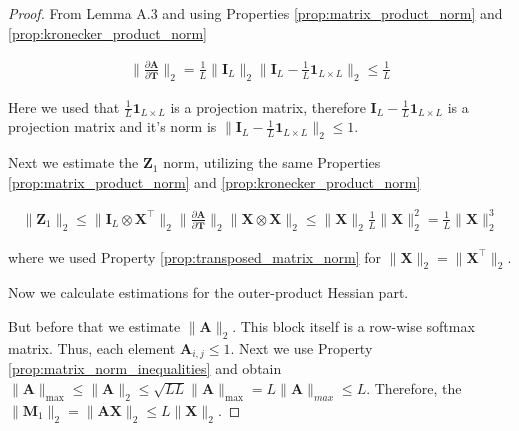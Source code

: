 \documentclass{article}
\begin{document}
\begin{proof}

From Lemma A.3 \cite{noci2022signalpropagationtransformerstheoretical} and using Properties \ref{prop:matrix_product_norm} and \ref{prop:kronecker_product_norm}

\begin{align*}
    \| \frac{\partial \mathbf{A}}{\partial \mathbf{T}}\|_2 = \frac{1}{L} \| \mathbf{I}_L\|_2 \| \mathbf{I}_L - \frac{1}{L}\mathbf{1}_{L \times L}\|_2 \leq \frac{1}{L}
\end{align*}

Here we used that $\frac{1}{L}\mathbf{1}_{L \times L}$ is a projection matrix, therefore $\mathbf{I}_L - \frac{1}{L}\mathbf{1}_{L \times L}$ is a projection matrix and it's norm is $\| \mathbf{I}_L - \frac{1}{L}\mathbf{1}_{L \times L}\|_2 \leq 1$.

Next we estimate the $\mathbf{Z}_1$  norm, utilizing the same Properties \ref{prop:matrix_product_norm} and \ref{prop:kronecker_product_norm}

\begin{align*}
    \| \mathbf{Z}_1\|_2 \leq \| \mathbf{I}_L \otimes \mathbf{X}^{\top}\|_2 \| \frac{\partial \mathbf{A}}{\partial \mathbf{T}}\|_2 \| \mathbf{X} \otimes \mathbf{X}\|_2 \leq \| \mathbf{X}\|_2 \frac{1}{L} \|\mathbf{X}\|^2_2 = \frac{1}{L} \|\mathbf{X}\|^3_2
\end{align*}

where we used Property \ref{prop:transposed_matrix_norm} for $\| \mathbf{X}\|_2 = \| \mathbf{X}^\top\|_2$.

Now we calculate estimations for the outer-product Hessian part.

But before that we estimate $\| \mathbf{A}\|_2$. This block itself is a row-wise softmax matrix. Thus, each element $ \mathbf{A}_{i,j} \leq 1$. Next we use Property \ref{prop:matrix_norm_inequalities} and obtain $ \|\mathbf{A}\|_{\max} \leq \|\mathbf{A}\|_2 \leq \sqrt{LL} \|\mathbf{A}\|_{\max} = L\| \mathbf{A}\|_{max} \leq L$. Therefore, the $\|\mathbf{M}_1\|_2 = \|\mathbf{A}\mathbf{X}\|_2 \leq L \|\mathbf{X}\|_2$.


\end{proof}
\end{document}
